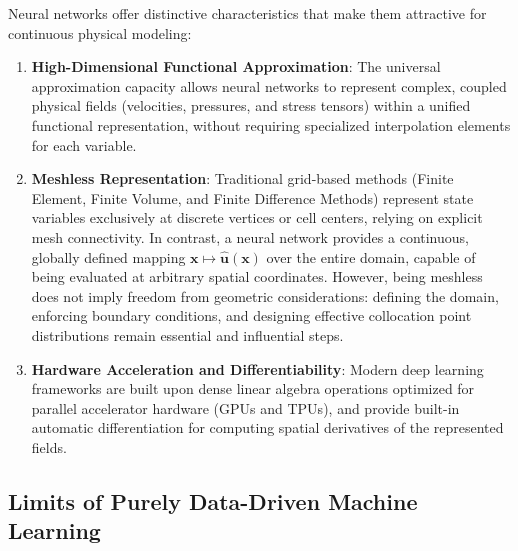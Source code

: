 Neural networks offer distinctive characteristics that make them attractive for continuous physical modeling:
\begin{enumerate}
    \item \textbf{High-Dimensional Functional Approximation}: The universal approximation capacity 
    allows neural networks to represent complex, coupled physical fields (velocities, pressures, and stress tensors) 
    within a unified functional representation, without requiring specialized interpolation elements for each variable.

    \item \textbf{Meshless Representation}: Traditional grid-based methods 
    (Finite Element, Finite Volume, and Finite Difference Methods) represent state variables 
    exclusively at discrete vertices or cell centers, relying on explicit mesh connectivity. 
    In contrast, a neural network provides a continuous, globally defined mapping $\boldsymbol{x} \mapsto \hat{\boldsymbol{u}}(\boldsymbol{x})$ 
    over the entire domain, capable of being evaluated at arbitrary spatial coordinates. 
    However, being meshless does not imply freedom from geometric considerations: defining the domain, 
    enforcing boundary conditions, and designing effective collocation point distributions remain essential 
    and influential steps.
    \item \textbf{Hardware Acceleration and Differentiability}: Modern deep learning frameworks 
    are built upon dense linear algebra operations optimized for parallel accelerator hardware (GPUs and TPUs), 
    and provide built-in automatic differentiation for computing spatial derivatives of the represented fields.
\end{enumerate}

\subsection{Limits of Purely Data-Driven Machine Learning}
\label{subsec:black_box_limits}

